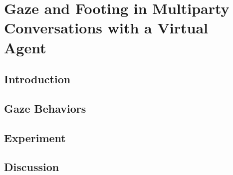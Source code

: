 \pagestyle{deposit}

\chapter{Gaze and Footing in Multiparty Conversations with a Virtual Agent}
\label{cha:GazeFooting}

\section{Introduction}
\label{sec:GazeFootingIntro}


\section{Gaze Behaviors}
\label{sec:GazeFootingBehaviors}


\section{Experiment}
\label{sec:GazeFootingExperiment}


\section{Discussion}
\label{sec:GazeFootingDiscussion}

